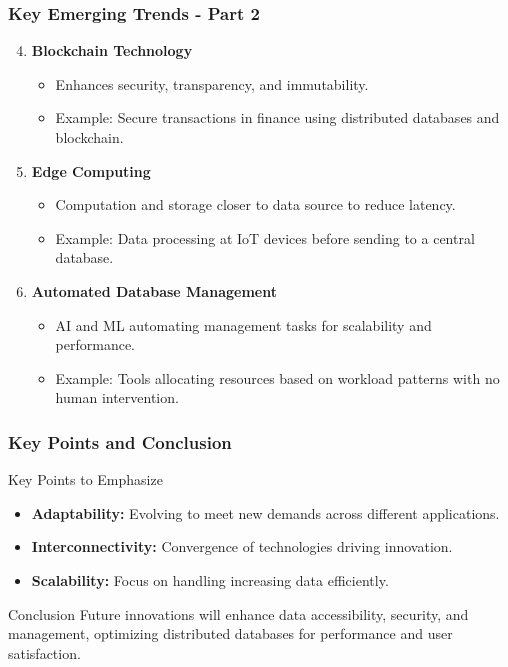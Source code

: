 \documentclass[aspectratio=169]{beamer}
\begin{document}
\begin{frame}[fragile]
    \frametitle{Key Emerging Trends - Part 2}
    \begin{enumerate}
        \setcounter{enumi}{3}
        \item \textbf{Blockchain Technology}
        \begin{itemize}
            \item Enhances security, transparency, and immutability.
            \item Example: Secure transactions in finance using distributed databases and blockchain.
        \end{itemize}

        \item \textbf{Edge Computing}
        \begin{itemize}
            \item Computation and storage closer to data source to reduce latency.
            \item Example: Data processing at IoT devices before sending to a central database.
        \end{itemize}

        \item \textbf{Automated Database Management}
        \begin{itemize}
            \item AI and ML automating management tasks for scalability and performance.
            \item Example: Tools allocating resources based on workload patterns with no human intervention.
        \end{itemize}
    \end{enumerate}
\end{frame}

\begin{frame}[fragile]
    \frametitle{Key Points and Conclusion}
    \begin{block}{Key Points to Emphasize}
        \begin{itemize}
            \item \textbf{Adaptability:} Evolving to meet new demands across different applications.
            \item \textbf{Interconnectivity:} Convergence of technologies driving innovation.
            \item \textbf{Scalability:} Focus on handling increasing data efficiently.
        \end{itemize}
    \end{block}

    \begin{block}{Conclusion}
        Future innovations will enhance data accessibility, security, and management, optimizing distributed databases for performance and user satisfaction.
    \end{block}
\end{frame}
\end{document}
